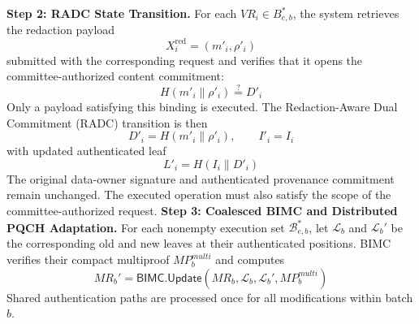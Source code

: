 \documentclass[lettersize,journal]{IEEEtran}
\begin{document}
    \medskip
    \noindent\textbf{Step 2: RADC State Transition.}
    For each $VR_i\in B^{*}_{e,b}$, the system retrieves the
    redaction payload
    \begin{equation}
    X_i^{\mathrm{red}}=(m'_i,\rho'_i)
    \end{equation}
    submitted with the corresponding request and verifies that it
    opens the committee-authorized content commitment:
    \begin{equation}
    H(m'_i\parallel\rho'_i)\stackrel{?}{=}D'_i
    \end{equation}
    Only a payload satisfying this binding is executed. The
    Redaction-Aware Dual Commitment (RADC) transition is then
    \begin{equation}
    D'_i=H(m'_i\parallel\rho'_i),\qquad I'_i=I_i
    \end{equation}
    with updated authenticated leaf
    \begin{equation}
    L'_i=H(I_i\parallel D'_i)
    \end{equation}
    The original data-owner signature and authenticated provenance
    commitment remain unchanged. The executed operation must also
    satisfy the scope of the committee-authorized request.
    \medskip
    \noindent\textbf{Step 3: Coalesced BIMC and
    Distributed PQCH Adaptation.}
    For each nonempty execution set
    $\mathcal{B}_{e,b}^{*}$, let
    $\mathcal{L}_b$ and $\mathcal{L}_b'$ be the
    corresponding old and new leaves at their
    authenticated positions. BIMC verifies their
    compact multiproof $MP_b^{multi}$ and computes
    \begin{equation}
    MR_b'=
    \mathsf{BIMC.Update}
    (MR_b,\mathcal{L}_b,\mathcal{L}_b',
    MP_b^{multi})
    \end{equation}
    Shared authentication paths are processed
    once for all modifications within batch $b$.
    
\end{document}
